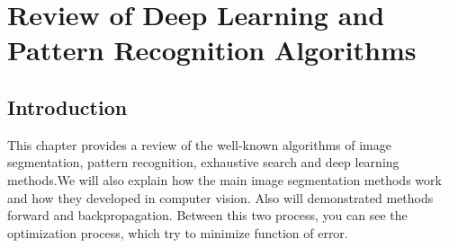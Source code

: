 \chapter{Review of Deep Learning and Pattern Recognition Algorithms}\label{ch:C}


\section{Introduction}\label{sec:3.1}
\par This chapter provides a review of the well-known algorithms of image segmentation, pattern recognition, exhaustive search and deep learning methods.We will also explain how the main image segmentation methods work and how they developed in computer vision. Also will demonstrated methods forward and backpropagation. Between this two process, you can see the optimization process, which try to minimize function of error. 


